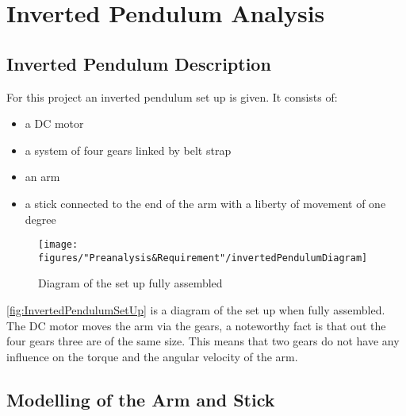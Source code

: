 \chapter{Inverted Pendulum Analysis}


\section{Inverted Pendulum Description}
For this project an inverted pendulum set up is given. It consists of:
\begin{itemize}
	\item a DC motor
	\item a system of four gears linked by belt strap
	\item an arm
	\item a stick connected to the end of the arm with a liberty of movement of one degree
\end{itemize}

\begin{figure} [htbp]
	\centering
	\texttt{[image: figures/"Preanalysis\&Requirement"/invertedPendulumDiagram]}
	\caption{Diagram of the set up fully assembled} \label{fig:InvertedPendulumSetUp}
\end{figure}

\autoref{fig:InvertedPendulumSetUp} is a diagram of the set up when fully assembled. The DC motor moves the arm via the gears, a noteworthy fact is that out the four gears three are of the same size. This means that two gears do not have any influence on the torque and the angular velocity of the arm.

\section{Modelling of the Arm and Stick}

